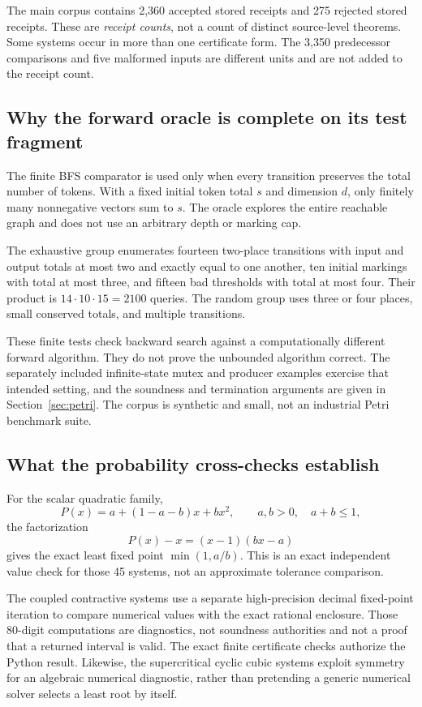 \documentclass[11pt,a4paper]{article}
\theoremstyle{definition}\newtheorem{definition}[theorem]{Definition}
\theoremstyle{remark}\newtheorem{remark}[theorem]{Remark}
\begin{document}
The main corpus contains 2,360 accepted stored receipts and 275 rejected stored receipts. These are \emph{receipt counts}, not a count of distinct source-level theorems. Some systems occur in more than one certificate form. The 3,350 predecessor comparisons and five malformed inputs are different units and are not added to the receipt count.

\subsection{Why the forward oracle is complete on its test fragment}
The finite BFS comparator is used only when every transition preserves the total number of tokens. With a fixed initial token total $s$ and dimension $d$, only finitely many nonnegative vectors sum to $s$. The oracle explores the entire reachable graph and does not use an arbitrary depth or marking cap.

The exhaustive group enumerates fourteen two-place transitions with input and output totals at most two and exactly equal to one another, ten initial markings with total at most three, and fifteen bad thresholds with total at most four. Their product is $14\cdot10\cdot15=2100$ queries. The random group uses three or four places, small conserved totals, and multiple transitions.

These finite tests check backward search against a computationally different forward algorithm. They do not prove the unbounded algorithm correct. The separately included infinite-state mutex and producer examples exercise that intended setting, and the soundness and termination arguments are given in Section~\ref{sec:petri}. The corpus is synthetic and small, not an industrial Petri benchmark suite.

\subsection{What the probability cross-checks establish}
For the scalar quadratic family,
\[
 P(x)=a+(1-a-b)x+bx^2,
 \qquad a,b>0,\quad a+b\le1,
\]
the factorization
\[
 P(x)-x=(x-1)(bx-a)
\]
gives the exact least fixed point $\min(1,a/b)$. This is an exact independent value check for those 45 systems, not an approximate tolerance comparison.

The coupled contractive systems use a separate high-precision decimal fixed-point iteration to compare numerical values with the exact rational enclosure. Those 80-digit computations are diagnostics, not soundness authorities and not a proof that a returned interval is valid. The exact finite certificate checks authorize the Python result. Likewise, the supercritical cyclic cubic systems exploit symmetry for an algebraic numerical diagnostic, rather than pretending a generic numerical solver selects a least root by itself.
\end{document}

